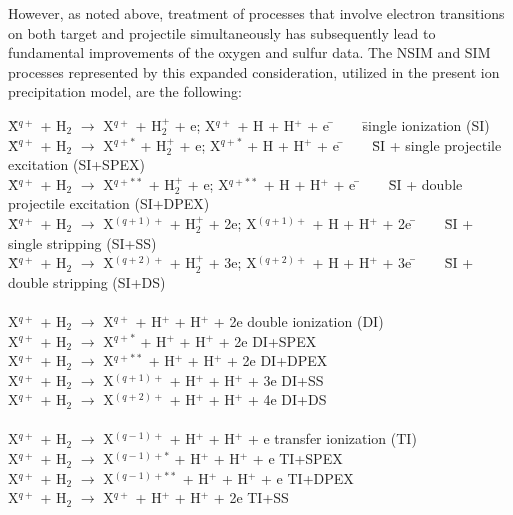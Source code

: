 \documentclass[draft]{agujournal2018}
\begin{document}
However, as noted above, treatment of processes that involve electron transitions on both target and projectile simultaneously has subsequently lead to fundamental improvements of the oxygen \citep{schultz2019} and sulfur \citep{gharibnejad2019} data.
The NSIM and SIM processes represented by this expanded consideration, utilized in the present ion precipitation model, are the following:

\begin{tabbing}
\= X$^{q+}$ + H$_2$ $\rightarrow$ X$^{q+}$ + H$_2^+$ + e;  X$^{q+}$ + H + H$^+$ + e \= $\;\;\;\;\;$ \= single ionization (SI) \\
\= X$^{q+}$ + H$_2$ $\rightarrow$ X$^{q+*}$ + H$_2^+$ + e;  X$^{q+*}$ + H + H$^+$ + e \= $\;\;\;\;\;$ \= SI + single projectile excitation (SI+SPEX) \\
\= X$^{q+}$ + H$_2$ $\rightarrow$ X$^{q+**}$ + H$_2^+$ + e;  X$^{q+**}$ + H + H$^+$ + e \= $\;\;\;\;\;$ \= SI + double projectile excitation (SI+DPEX) \\
\= X$^{q+}$ + H$_2$ $\rightarrow$ X$^{(q+1)+}$ + H$_2^+$ + 2e;  X$^{(q+1)+}$ + H + H$^+$ + 2e \= $\;\;\;\;\;$ \= SI + single stripping (SI+SS)\\
\= X$^{q+}$ + H$_2$ $\rightarrow$ X$^{(q+2)+}$ + H$_2^+$ + 3e;  X$^{(q+2)+}$ + H + H$^+$ + 3e \= $\;\;\;\;\;$ \= SI + double stripping (SI+DS) \\
\\
\> X$^{q+}$ + H$_2$ $\rightarrow$ X$^{q+}$ + H$^+$ + H$^+$ + 2e	 \>  \> double ionization (DI) \\
\> X$^{q+}$ + H$_2$ $\rightarrow$ X$^{q+*}$ + H$^+$ + H$^+$ + 2e \>  \> DI+SPEX \\
\> X$^{q+}$ + H$_2$ $\rightarrow$ X$^{q+**}$ + H$^+$ + H$^+$ + 2e \>  \> DI+DPEX \\
\> X$^{q+}$ + H$_2$ $\rightarrow$ X$^{(q+1)+}$ + H$^+$ + H$^+$ + 3e \>  \> DI+SS \\
\> X$^{q+}$ + H$_2$ $\rightarrow$ X$^{(q+2)+}$ + H$^+$ + H$^+$ + 4e	 \>  \> DI+DS \\
\\
\> X$^{q+}$ + H$_2$ $\rightarrow$ X$^{(q-1)+}$ + H$^+$ + H$^+$ + e  \>  \> transfer ionization (TI) \\
\> X$^{q+}$ + H$_2$ $\rightarrow$ X$^{(q-1)+*}$ + H$^+$ + H$^+$ + e  \>  \> TI+SPEX \\
\> X$^{q+}$ + H$_2$ $\rightarrow$ X$^{(q-1)+**}$ + H$^+$ + H$^+$ + e  \>  \> TI+DPEX \\
\> X$^{q+}$ + H$_2$ $\rightarrow$ X$^{q+}$ + H$^+$ + H$^+$ + 2e  \>  \> TI+SS \\

\end{tabbing}
\end{document}
